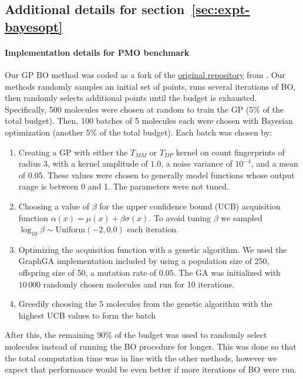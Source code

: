 \documentclass{article}
\theoremstyle{plain}
\theoremstyle{definition}
\theoremstyle{remark}
\begin{document}
\subsection{Additional details for section~\ref{sec:expt-bayesopt}}\label{apdx:bayesopt-expt-details}

\paragraph{Implementation details for PMO benchmark}
Our GP BO method was coded as a fork of the \href{https://github.com/wenhao-gao/mol_opt}{original repository} from \citet{gao2022sample}.
Our methods randomly samples an initial set of points, runs several iterations of BO,
then randomly selects additional points until the budget is exhausted.
Specifically, 500 molecules were chosen at random to train the GP (5\% of the total budget).
Then, 100 batches of 5 molecules each were chosen with Bayesian optimization (another 5\% of the total budget).
Each batch was chosen by:
\begin{enumerate}
    \item Creating a GP with either the $T_{MM}$ or $T_{DP}$ kernel on count fingerprints of radius 3, with a kernel amplitude of $1.0$, a noise variance of $10^{-4}$, and a mean of 0.05.
    These values were chosen to generally model functions whose output range is between 0 and 1. The parameters were not tuned.
    \item Choosing a value of $\beta$ for the upper confidence bound (UCB) acquisition function $\alpha(x)=\mu(x)+\beta\sigma(x)$.
    To avoid tuning $\beta$ we sampled $\log_{10}{\beta}\sim\mathrm{Uniform}(-2, 0.0)$ each iteration.
    \item Optimizing the acquisition function with a genetic algorithm. We used the GraphGA implementation included by \citet{gao2022sample} using a population size of 250, offspring size of 50, a mutation rate of $0.05$.
    The GA was initialized with $10\,000$ randomly chosen molecules and run for 10 iterations.
    \item Greedily choosing the 5 molecules from the genetic algorithm with the highest UCB values to form the batch
\end{enumerate}
After this, the remaining 90\% of the budget was used to randomly select molecules instead of running the BO procedure for longer.
This was done so that the total computation time was in line with the other methods,
however we expect that performance would be even better if more iterations of BO were run.
\end{document}
